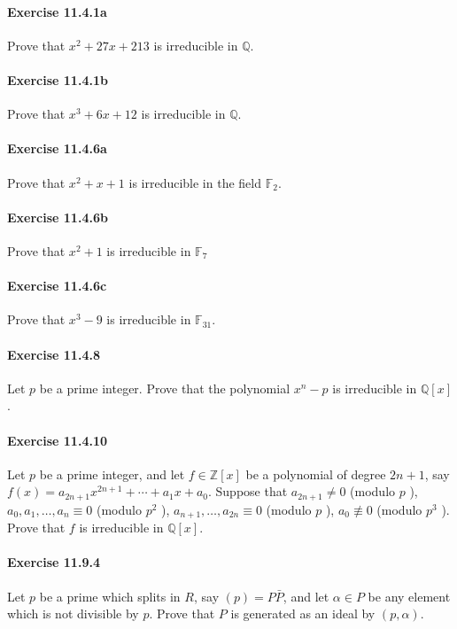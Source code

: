 \documentclass{article}
\begin{document}
\paragraph{Exercise 11.4.1a} Prove that $x^2 + 27x + 213$ is irreducible in $\mathbb{Q}$. 

\paragraph{Exercise 11.4.1b} Prove that $x^3 + 6x + 12$ is irreducible in $\mathbb{Q}$. 

\paragraph{Exercise 11.4.6a} Prove that $x^2+x+1$ is irreducible in the field $\mathbb{F}_2$. 

\paragraph{Exercise 11.4.6b} Prove that $x^2+1$ is irreducible in $\mathbb{F}_7$

\paragraph{Exercise 11.4.6c} Prove that $x^3 - 9$ is irreducible in $\mathbb{F}_31$. 

\paragraph{Exercise 11.4.8} Let $p$ be a prime integer. Prove that the polynomial $x^n-p$ is irreducible in $\mathbb{Q}[x]$.

\paragraph{Exercise 11.4.10} Let $p$ be a prime integer, and let $f \in \mathbb{Z}[x]$ be a polynomial of degree $2 n+1$, say $f(x)=a_{2 n+1} x^{2 n+1}+\cdots+a_1 x+a_0$. Suppose that $a_{2 n+1} \neq 0$ (modulo $p$ ), $a_0, a_1, \ldots, a_n \equiv 0$ (modulo $p^2$ ), $a_{n+1}, \ldots, a_{2 n} \equiv 0$ (modulo $p$ ), $a_0 \not\equiv 0$ (modulo $p^3$ ). Prove that $f$ is irreducible in $\mathbb{Q}[x]$. 

\paragraph{Exercise 11.9.4} Let $p$ be a prime which splits in $R$, say $(p)=P \bar{P}$, and let $\alpha \in P$ be any element which is not divisible by $p$. Prove that $P$ is generated as an ideal by $(p, \alpha)$.
\end{document}
